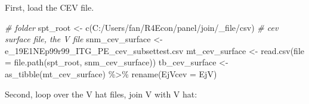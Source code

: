\documentclass[
]{book}
\newenvironment{Shaded}{\begin{snugshade}}{\end{snugshade}}
\newcommand{\AttributeTok}[1]{\textcolor[rgb]{0.77,0.63,0.00}{#1}}
\newcommand{\CommentTok}[1]{\textcolor[rgb]{0.56,0.35,0.01}{\textit{#1}}}
\newcommand{\FunctionTok}[1]{\textcolor[rgb]{0.00,0.00,0.00}{#1}}
\newcommand{\NormalTok}[1]{#1}
\newcommand{\OtherTok}[1]{\textcolor[rgb]{0.56,0.35,0.01}{#1}}
\newcommand{\SpecialCharTok}[1]{\textcolor[rgb]{0.00,0.00,0.00}{#1}}
\newcommand{\StringTok}[1]{\textcolor[rgb]{0.31,0.60,0.02}{#1}}
\begin{document}
First, load the CEV file.

\begin{Shaded}
\begin{Highlighting}[]
\CommentTok{\# folder}
\NormalTok{spt\_root }\OtherTok{\textless{}{-}} \FunctionTok{c}\NormalTok{(}\StringTok{\textquotesingle{}C:/Users/fan/R4Econ/panel/join/\_file/csv\textquotesingle{}}\NormalTok{)}
\CommentTok{\# cev surface file, the V file}
\NormalTok{snm\_cev\_surface }\OtherTok{\textless{}{-}} \StringTok{\textquotesingle{}e\_19E1NEp99r99\_ITG\_PE\_cev\_subsettest.csv\textquotesingle{}}
\NormalTok{mt\_cev\_surface }\OtherTok{\textless{}{-}} \FunctionTok{read.csv}\NormalTok{(}\AttributeTok{file =} \FunctionTok{file.path}\NormalTok{(spt\_root, snm\_cev\_surface))}
\NormalTok{tb\_cev\_surface }\OtherTok{\textless{}{-}} \FunctionTok{as\_tibble}\NormalTok{(mt\_cev\_surface) }\SpecialCharTok{\%\textgreater{}\%}
  \FunctionTok{rename}\NormalTok{(}\AttributeTok{EjVcev =}\NormalTok{ EjV)}
\end{Highlighting}
\end{Shaded}

Second, loop over the V hat files, join V with V hat:
\end{document}
